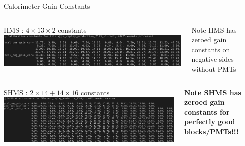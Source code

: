 \documentclass[aspectratio=169,xcolor=dvipsnames]{beamer}
\begin{document}
\begin{frame}{Calorimeter Gain Constants}
  \centering
  \vspace{-0.5cm}
  \begin{columns}
    \begin{column}[T]{0.8\textwidth}
      \begin{block}{HMS : $4\times13\times2$ constants}
        \includegraphics[width=\textwidth]{hms_calparam.png}\\
      \end{block}
    \end{column}
    \begin{column}[T]{0.2\textwidth}
      \smaller 
      \vspace{1cm}
      Note HMS has zeroed gain constants on negative sides without PMTs
    \end{column}
  \end{columns}
  \begin{columns}
    \begin{column}[T]{0.8\textwidth}
      \begin{block}{SHMS : $2\times14 + 14\times16$ constants}
        \includegraphics[width=\textwidth]{shms_calparam.png}\\
      \end{block}
    \end{column}
    \begin{column}[T]{0.2\textwidth}
      \smaller 
      \vspace{1cm}
      \alert{\textbf{Note SHMS has zeroed gain constants for perfectly good blocks/PMTs!!!}}
    \end{column}
  \end{columns}
\end{frame}
\end{document}
